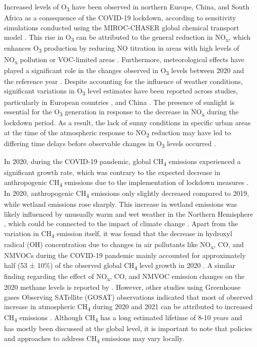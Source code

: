 Increased levels of O\textsubscript{3} have been observed in northern Europe, China, and South Africa as a consequence of the COVID-19 lockdown, according to sensitivity simulations conducted using the MIROC-CHASER global chemical transport model \citep{miyazaki2021global}. This rise in O\textsubscript{3} can be attributed to the general reduction in NO\textsubscript{x}, which enhances O\textsubscript{3} production by reducing NO titration in areas with high levels of NO\textsubscript{x} pollution or VOC-limited areas \citep{akimoto2022rethinking}. Furthermore, meteorological effects have played a significant role in the changes observed in O\textsubscript{3} levels between 2020 and the reference year \citep{ordonez2020early,liu2021diverse}. Despite accounting for the influence of weather conditions, significant variations in O\textsubscript{3} level estimates have been reported across studies, particularly in European countries \citep{ordonez2020early,grange2021covid}, and China \citep{liu2021diverse,shi2021abrupt}. The presence of sunlight is essential for the O\textsubscript{3} generation in response to the decrease in NO\textsubscript{x} during the lockdown period. As a result, the lack of sunny conditions in specific urban areas at the time of the atmospheric response to NO\textsubscript{2} reduction may have led to differing time delays before observable changes in O\textsubscript{3} levels occurred \citep{grange2021covid}. \par

In 2020, during the COVID-19 pandemic, global CH\textsubscript{4} emissions experienced a significant growth rate, which was contrary to the expected decrease in anthropogenic CH\textsubscript{4} emissions due to the implementation of lockdown measures \citep{peng2022wetland}.  In 2020, anthropogenic CH\textsubscript{4} emissions only slightly decreased compared to 2019, while wetland emissions rose sharply. This increase in wetland emissions was likely influenced by unusually warm and wet weather in the Northern Hemisphere \citep{peng2022wetland}, which could be connected to the impact of climate change \citep{zhang2023recent}. Apart from the variation in CH\textsubscript{4} emission itself, it was found that the decrease in hydroxyl radical (OH) concentration due to changes in air pollutants like NO\textsubscript{x}, CO, and NMVOCs during the COVID-19 pandemic mainly accounted for approximately half (53 ± 10\%) of the observed global CH\textsubscript{4} level growth in 2020 \citep{peng2022wetland}. A similar finding regarding the effect of NO\textsubscript{x}, CO, and NMVOC emission changes on the 2020 methane levels is reported by \citep{stevenson2022covid}. However, other studies using Greenhouse gases Observing SATellite (GOSAT) observations indicated that most of observed increase in atmospheric CH\textsubscript{4} during 2020 and 2021 can be attributed to increased CH\textsubscript{4} emissions \citep{qu2022attribution,feng2023methane}. Although CH\textsubscript{4} has a long estimated lifetime of 8-10 years and has mostly been discussed at the global level, it is important to note that policies and approaches to address CH\textsubscript{4} emissions may vary locally. \par


